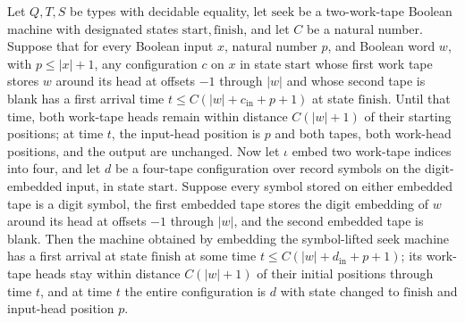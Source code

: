 \begin{theorem}
\label{Turing.recordStep_seek_transport}
\leanok
{}
Let $Q,T,S$ be types with decidable equality, let $\mathrm{seek}$ be a two-work-tape
Boolean machine with designated states $\mathrm{start},\mathrm{finish}$, and let $C$ be
a natural number. Suppose that for every Boolean input $x$, natural number $p$, and
Boolean word $w$, with $p\le |x|+1$, any configuration $c$ on $x$ in state
$\mathrm{start}$ whose first work tape stores $w$ around its head at offsets $-1$
through $|w|$ and whose second tape is blank has a first arrival time $t\le
C(|w|+c_{\mathrm{in}}+p+1)$ at state $\mathrm{finish}$. Until that time, both work-tape
heads remain within distance $C(|w|+1)$ of their starting positions; at time $t$, the
input-head position is $p$ and both tapes, both work-head positions, and the output are
unchanged. Now let $\iota$ embed two work-tape indices into four, and let $d$ be a
four-tape configuration over record symbols on the digit-embedded input, in state
$\mathrm{start}$. Suppose every symbol stored on either embedded tape is a digit symbol,
the first embedded tape stores the digit embedding of $w$ around its head at offsets
$-1$ through $|w|$, and the second embedded tape is blank. Then the machine obtained by
embedding the symbol-lifted seek machine has a first arrival at state $\mathrm{finish}$
at some time $t\le C(|w|+d_{\mathrm{in}}+p+1)$; its work-tape heads stay within distance
$C(|w|+1)$ of their initial positions through time $t$, and at time $t$ the entire
configuration is $d$ with state changed to $\mathrm{finish}$ and input-head position
$p$.
\end{theorem}

